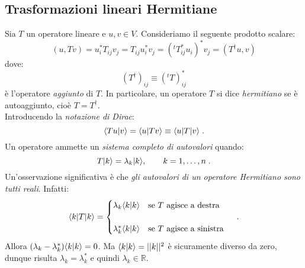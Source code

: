 \subsection*{Trasformazioni lineari Hermitiane}
Sia $T$ un operatore lineare e $u,v\in V$. Consideriamo il seguente prodotto scalare:
\begin{equation}
(u,Tv)=u_i^*T_{ij}v_j=T_{ij}u_i^*v_j=({}^tT_{ij}^*u_i)^*v_j=(T^{\dagger}u,v)
\end{equation}
dove:
\begin{equation}
(T^{\dagger})_{ij}\equiv ({}^tT)_{ij}^*
\end{equation}
è l'operatore \textit{aggiunto} di $T$. In particolare, un operatore $T$ si dice \textit{hermitiano} se è autoaggiunto, cioè $T=T^{\dagger}$. \\

Introducendo la \textit{notazione di Dirac}:
\begin{equation}
\langle Tu|v\rangle=\langle u|Tv\rangle\equiv \langle u|T|v\rangle\;.
\end{equation}
Un operatore ammette un \textit{sistema completo di autovalori} quando:
\begin{equation}
T|k\rangle=\lambda_k|k\rangle,\qquad k=1,\ldots,n\;.
\end{equation}
Un'osservazione significativa è che \textit{gli autovalori di un operatore Hermitiano sono tutti reali}. Infatti:
\begin{equation}
\langle k|T|k\rangle=\begin{cases}
\lambda_k\langle k|k\rangle\quad \mbox{se $T$ agisce a destra} \\
\\
\lambda_k^*\langle k|k\rangle\quad \mbox{se $T$ agisce a sinistra}
\end{cases}\;.
\end{equation}
Allora $(\lambda_k-\lambda_k^*)\langle k|k\rangle=0$. Ma $\langle k|k\rangle=||k||^2$ è sicuramente diverso da zero, dunque risulta $\lambda_k=\lambda_k^*$ e quindi $\lambda_k\in\mathbb{R}$.
\\

